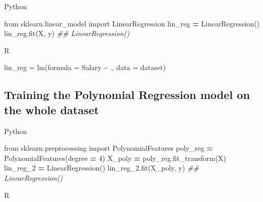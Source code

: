 \documentclass[
]{book}
\newenvironment{Shaded}{\begin{snugshade}}{\end{snugshade}}
\newcommand{\AttributeTok}[1]{\textcolor[rgb]{0.77,0.63,0.00}{#1}}
\newcommand{\CommentTok}[1]{\textcolor[rgb]{0.56,0.35,0.01}{\textit{#1}}}
\newcommand{\DecValTok}[1]{\textcolor[rgb]{0.00,0.00,0.81}{#1}}
\newcommand{\FunctionTok}[1]{\textcolor[rgb]{0.00,0.00,0.00}{#1}}
\newcommand{\ImportTok}[1]{#1}
\newcommand{\NormalTok}[1]{#1}
\newcommand{\OperatorTok}[1]{\textcolor[rgb]{0.81,0.36,0.00}{\textbf{#1}}}
\newcommand{\OtherTok}[1]{\textcolor[rgb]{0.56,0.35,0.01}{#1}}
\newcommand{\SpecialCharTok}[1]{\textcolor[rgb]{0.00,0.00,0.00}{#1}}
\theoremstyle{definition}
\theoremstyle{definition}
\theoremstyle{definition}
\theoremstyle{definition}
\theoremstyle{remark}
\begin{document}
Python

\begin{Shaded}
\begin{Highlighting}[]
\ImportTok{from}\NormalTok{ sklearn.linear\_model }\ImportTok{import}\NormalTok{ LinearRegression}
\NormalTok{lin\_reg }\OperatorTok{=}\NormalTok{ LinearRegression()}
\NormalTok{lin\_reg.fit(X, y)}
\CommentTok{\#\# LinearRegression()}
\end{Highlighting}
\end{Shaded}

R

\begin{Shaded}
\begin{Highlighting}[]
\NormalTok{lin\_reg }\OtherTok{=} \FunctionTok{lm}\NormalTok{(}\AttributeTok{formula =}\NormalTok{ Salary }\SpecialCharTok{\textasciitilde{}}\NormalTok{ .,}
             \AttributeTok{data =}\NormalTok{ dataset)}
\end{Highlighting}
\end{Shaded}

\hypertarget{training-the-polynomial-regression-model-on-the-whole-dataset}{%
\subsection{Training the Polynomial Regression model on the whole dataset}\label{training-the-polynomial-regression-model-on-the-whole-dataset}}

Python

\begin{Shaded}
\begin{Highlighting}[]
\ImportTok{from}\NormalTok{ sklearn.preprocessing }\ImportTok{import}\NormalTok{ PolynomialFeatures}
\NormalTok{poly\_reg }\OperatorTok{=}\NormalTok{ PolynomialFeatures(degree }\OperatorTok{=} \DecValTok{4}\NormalTok{)}
\NormalTok{X\_poly }\OperatorTok{=}\NormalTok{ poly\_reg.fit\_transform(X)}
\NormalTok{lin\_reg\_2 }\OperatorTok{=}\NormalTok{ LinearRegression()}
\NormalTok{lin\_reg\_2.fit(X\_poly, y)}
\CommentTok{\#\# LinearRegression()}
\end{Highlighting}
\end{Shaded}

R

\begin{Shaded}
\end{Shaded}
\end{document}
